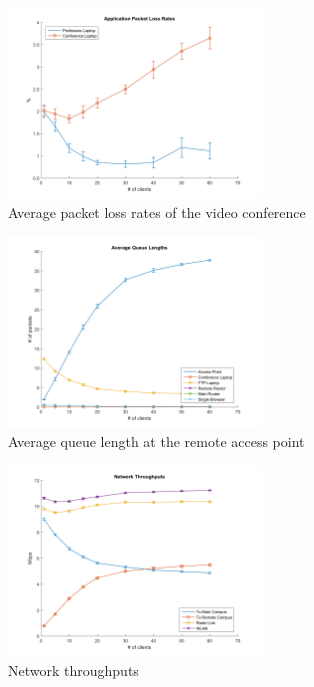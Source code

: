 \documentclass[
10pt, %
a4paper, %
oneside, %
headinclude,footinclude, %
BCOR5mm, %
]{scrartcl}
\begin{document}
\begin{figure}[!ht]
  \centering
  \includegraphics[width=0.6\textwidth]{Figures/nocctv/Application_Packet_Loss_Rates.png}
  \caption{Average packet loss rates of the video conference} \label{fig:app_pkt_loss}
\end{figure}
\begin{figure}[!ht]
  \centering
  \includegraphics[width=0.6\textwidth]{Figures/nocctv/Average_Queue_Lengths.png}
  \caption{Average queue length at the remote access point} \label{fig:rap_queue_len}
\end{figure}
\begin{figure}[!ht]
  \centering
  \includegraphics[width=0.6\textwidth]{Figures/nocctv/Network_Throughputs.png}
  \caption{Network throughputs} \label{fig:net_throughput}
\end{figure}
\end{document}
